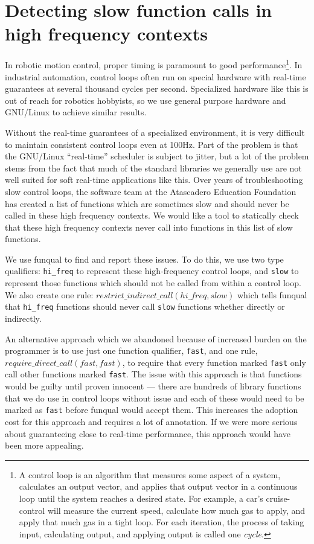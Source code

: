 \section{Detecting slow function calls in high frequency contexts}\label{sec:app:blocking}

In robotic motion control, proper timing is paramount to good performance\footnote{A control loop is an algorithm that measures some aspect of a system, calculates an output vector, and applies that output vector in a continuous loop until the system reaches a desired state.  For example, a car's cruise-control will measure the current speed, calculate how much gas to apply, and apply that much gas in a tight loop.  For each iteration, the process of taking input, calculating output, and applying output is called one \textit{cycle}.}.  In industrial automation, control loops often run on special hardware with real-time guarantees at several thousand cycles per second.  Specialized hardware like this is out of reach for robotics hobbyists, so we use general purpose hardware and GNU/Linux to achieve similar results. 

Without the real-time guarantees of a specialized environment, it is very difficult to maintain consistent control loops even at 100Hz.  Part of the problem is that the GNU/Linux ``real-time'' scheduler is subject to jitter, but a lot of the problem stems from the fact that much of the standard libraries we generally use are not well suited for soft real-time applications like this.  Over years of troubleshooting slow control loops, the software team at the Atascadero Education Foundation has created a list of functions which are sometimes slow and should never be called in these high frequency contexts.  We would like a tool to statically check that these high frequency contexts never call into functions in this list of slow functions.  

We use funqual to find and report these issues.  To do this, we use two type qualifiers: \lstinline{hi_freq} to represent these high-frequency control loops, and \lstinline{slow} to represent those functions which should not be called from within a control loop.  We also create one rule: $restrict\_indirect\_call(hi\_freq, slow)$ which tells funqual that \lstinline{hi_freq} functions should never call \lstinline{slow} functions whether directly or indirectly. 

An alternative approach which we abandoned because of increased burden on the programmer is to use just one function qualifier, \lstinline{fast}, and one rule, $require\_direct\_call(\allowbreak fast, fast)$, to require that every function marked \lstinline{fast} only call other functions marked \lstinline{fast}.  The issue with this approach is that  functions would be guilty until proven innocent --- there are hundreds of library functions that we do use in control loops without issue and each of these would need to be marked as \lstinline{fast} before funqual would accept them.  This increases the adoption cost for this approach and requires a lot of annotation. If we were more serious about guaranteeing close to real-time performance, this approach would have been more appealing.  

